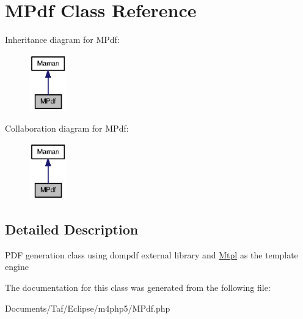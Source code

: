 \hypertarget{classMPdf}{
\section{MPdf Class Reference}
\label{classMPdf}
}
Inheritance diagram for MPdf:\nopagebreak
\begin{figure}[H]
\begin{center}
\leavevmode
\includegraphics[width=46pt]{classMPdf__inherit__graph}
\end{center}
\end{figure}
Collaboration diagram for MPdf:\nopagebreak
\begin{figure}[H]
\begin{center}
\leavevmode
\includegraphics[width=46pt]{classMPdf__coll__graph}
\end{center}
\end{figure}


\subsection{Detailed Description}
PDF generation class using dompdf external library and \hyperlink{classMtpl}{Mtpl} as the template engine 

The documentation for this class was generated from the following file:\begin{CompactItemize}
\item 
Documents/Taf/Eclipse/m4php5/MPdf.php\end{CompactItemize}
